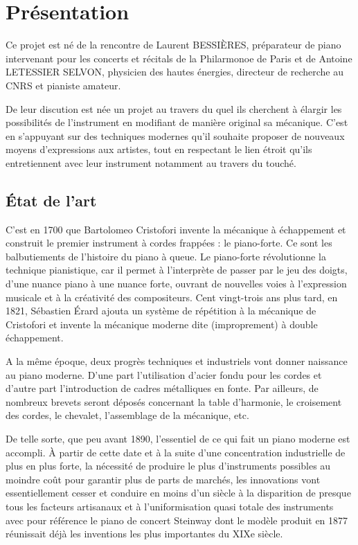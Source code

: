 \documentclass[french,a4paper,12pt]{report}
\begin{document}
  \chapter{Présentation}
  
  Ce projet est né de la rencontre de Laurent BESSIÈRES, préparateur de piano intervenant pour les concerts et récitals de la Philarmonoe de Paris et de Antoine LETESSIER SELVON, physicien des hautes énergies, directeur de recherche au CNRS et pianiste amateur. 
  
  De leur discution est née un projet au travers du quel ils cherchent à élargir les possibilités de l'instrument en modifiant de manière original sa mécanique. C'est en s'appuyant sur des techniques modernes qu'il souhaite proposer de nouveaux moyens d'expressions aux artistes, tout en respectant le lien étroit qu'ils entretiennent avec leur instrument notamment au travers du touché.
  
  \section{État de l'art}
  
  C’est en 1700 que Bartolomeo Cristofori invente la mécanique à échappement et construit le premier instrument à cordes frappées : le piano-forte. Ce sont les balbutiements de l’histoire du piano à queue. Le piano-forte révolutionne la technique pianistique, car il permet à l’interprète de passer par le jeu des doigts, d’une nuance piano à une nuance forte, ouvrant de nouvelles voies à l’expression musicale et à la créativité des compositeurs. Cent vingt-trois ans plus tard, en 1821, Sébastien Érard ajouta un système de répétition à la mécanique de Cristofori et invente la mécanique moderne dite (improprement) à double échappement.

A la même époque, deux progrès techniques et industriels vont donner naissance au piano moderne. D’une part l’utilisation d’acier fondu pour les cordes et d’autre part l’introduction de cadres métalliques en fonte. Par ailleurs, de nombreux brevets seront déposés concernant la table d’harmonie, le croisement des cordes, le chevalet, l’assemblage de la mécanique, etc. 

De telle sorte, que peu avant 1890, l’essentiel de ce qui fait un piano moderne est accompli. À partir de cette date et à la suite d’une concentration industrielle de plus en plus forte, la nécessité de produire le plus d’instruments possibles au moindre coût pour garantir plus de parts de marchés, les innovations vont essentiellement cesser et conduire en moins d’un siècle à la disparition de presque tous les facteurs artisanaux et à l’uniformisation quasi totale des instruments avec pour référence le piano de concert Steinway dont le modèle produit en 1877 réunissait déjà les inventions les plus importantes du XIXe siècle.
\end{document}
